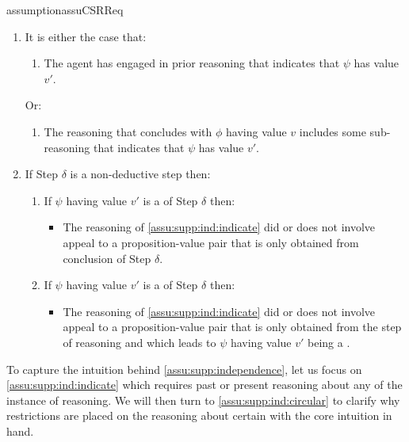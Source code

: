 \begin{note}
\begin{restatable}{assumption}{assuCSRReq}
    \begin{enumerate}[label=\arabic*., ref=(\arabic*)]
    \item
      \label{assu:supp:ind:indicate}
      It is either the case that:
      \begin{enumerate}[label=\alph*., ref=(\alph*)]
      \item
        The agent has engaged in prior reasoning that indicates that \(\psi\) has value \(v'\).
      \end{enumerate}
      Or:
      \begin{enumerate}[label=\alph*., ref=(\alph*), resume]
      \item
        The reasoning that concludes with \(\phi\) having value \(v\) includes some sub-reasoning that indicates that \(\psi\) has value \(v'\).
      \end{enumerate}
    \item
      \label{assu:supp:ind:circular}
      If Step \(\delta\) is a non-deductive step then:
      \begin{enumerate}[label=\alph*., ref=(\alph*)]
      \item
        \label{assu:supp:ind:circular:p}
        If \(\psi\) having value \(v'\) is a \prequ{} of Step \(\delta\) then:
        \begin{itemize}
        \item
          The reasoning of \ref{assu:supp:ind:indicate} did or does not involve appeal to a proposition-value pair that is only obtained from conclusion of Step \(\delta\).
        \end{itemize}
      \item
        \label{assu:supp:ind:circular:cp}
        If \(\psi\) having value \(v'\) is  a \cprequ{} of Step \(\delta\) then:
        \begin{itemize}
        \item
          The reasoning of \ref{assu:supp:ind:indicate} did or does not involve appeal to a proposition-value pair that is only obtained from the step of reasoning and  which leads to \(\psi\) having value \(v'\) being a \prequ{}.
        \end{itemize}
      \end{enumerate}
    \end{enumerate}
    \vspace{-\baselineskip}
  \end{restatable}
\end{note}

\begin{note}
  To capture the intuition behind \autoref{assu:supp:independence}, let us focus on \ref{assu:supp:ind:indicate} which requires past or present reasoning about any \requ{} of the instance of reasoning.
  We will then turn to \ref{assu:supp:ind:circular} to clarify why restrictions are placed on the reasoning about certain  with the core intuition in hand.
\end{note}

